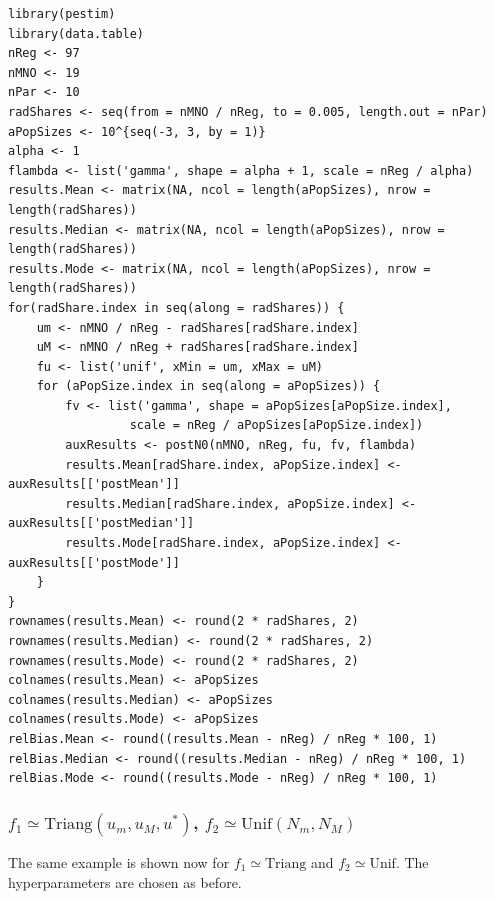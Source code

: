 \documentclass[12pt, a4paper]{article}
\begin{document}
\begin{verbatim}
library(pestim)
library(data.table)
nReg <- 97
nMNO <- 19
nPar <- 10
radShares <- seq(from = nMNO / nReg, to = 0.005, length.out = nPar)
aPopSizes <- 10^{seq(-3, 3, by = 1)}
alpha <- 1
flambda <- list('gamma', shape = alpha + 1, scale = nReg / alpha)
results.Mean <- matrix(NA, ncol = length(aPopSizes), nrow = length(radShares))
results.Median <- matrix(NA, ncol = length(aPopSizes), nrow = length(radShares))
results.Mode <- matrix(NA, ncol = length(aPopSizes), nrow = length(radShares))
for(radShare.index in seq(along = radShares)) {
    um <- nMNO / nReg - radShares[radShare.index]
    uM <- nMNO / nReg + radShares[radShare.index]
    fu <- list('unif', xMin = um, xMax = uM)
    for (aPopSize.index in seq(along = aPopSizes)) {
        fv <- list('gamma', shape = aPopSizes[aPopSize.index], 
                 scale = nReg / aPopSizes[aPopSize.index])
        auxResults <- postN0(nMNO, nReg, fu, fv, flambda)
        results.Mean[radShare.index, aPopSize.index] <- auxResults[['postMean']] 
        results.Median[radShare.index, aPopSize.index] <- auxResults[['postMedian']]
        results.Mode[radShare.index, aPopSize.index] <- auxResults[['postMode']]
    }
}
rownames(results.Mean) <- round(2 * radShares, 2)
rownames(results.Median) <- round(2 * radShares, 2)
rownames(results.Mode) <- round(2 * radShares, 2)
colnames(results.Mean) <- aPopSizes
colnames(results.Median) <- aPopSizes
colnames(results.Mode) <- aPopSizes
relBias.Mean <- round((results.Mean - nReg) / nReg * 100, 1)
relBias.Median <- round((results.Median - nReg) / nReg * 100, 1)
relBias.Mode <- round((results.Mode - nReg) / nReg * 100, 1)
\end{verbatim}

\subsubsection{$f_{1}\simeq\textrm{Triang}(u_{m}, u_{M}, u^{*})$, $f_{2}\simeq\textrm{Unif}(N_{m}, N_{M})$}

The same example is shown now for $f_{1}\simeq\textrm{Triang}$ and $f_{2}\simeq\textrm{Unif}$. The hyperparameters are chosen as before.
\end{document}
